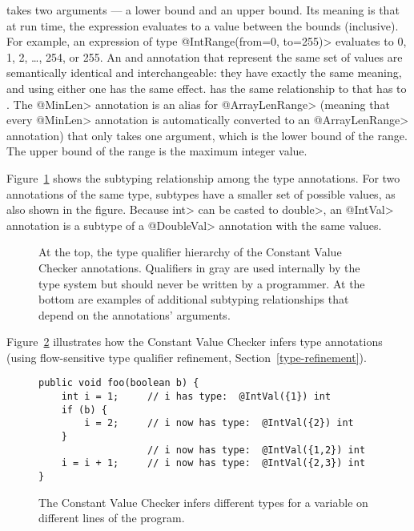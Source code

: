  takes two arguments --- a lower
bound and an upper bound.  Its meaning is that at run time, the expression
evaluates to a value between the bounds (inclusive).  For example, an
expression of type \<@IntRange(from=0, to=255)> evaluates to
0, 1, 2, \ldots, 254, or 255.
An  and
 annotation that represent the
same set of values are semantically identical and interchangeable:  they
have exactly the same meaning, and using either one has the same effect.
 has the same relationship
to  that
 has to
.
The \<@MinLen> annotation is an alias for \<@ArrayLenRange> (meaning that every \<@MinLen> annotation
 is automatically converted to an \<@ArrayLenRange> annotation) that only takes
one argument, which is the lower bound of the range. The upper bound of the
range is the maximum integer value.

Figure~\ref{fig-value-hierarchy} shows the
subtyping relationship among the type annotations.
For two annotations of the same type, subtypes have a smaller set of
possible values, as also shown in the figure.
Because \<int> can be casted to \<double>, an \<@IntVal> annotation is a
subtype of a \<@DoubleVal> annotation with the same values.

\begin{figure}
\caption{At the top, the type qualifier hierarchy of the Constant Value Checker
annotations. Qualifiers in gray are used
internally by the type system but should never be written by a
programmer.  At the bottom are examples of additional subtyping
relationships that depend on the annotations' arguments.}
\label{fig-value-hierarchy}
\end{figure}

Figure~\ref{fig-value-multivalue} illustrates how the Constant Value Checker
infers type annotations (using flow-sensitive type qualifier refinement, Section~\ref{type-refinement}).

\begin{figure}
\begin{Verbatim}
public void foo(boolean b) {
    int i = 1;     // i has type:  @IntVal({1}) int
    if (b) {
        i = 2;     // i now has type:  @IntVal({2}) int
    }
                   // i now has type:  @IntVal({1,2}) int
    i = i + 1;     // i now has type:  @IntVal({2,3}) int
}
\end{Verbatim}
\caption{The Constant Value Checker infers different types
  for a variable on different lines of the program.}
\label{fig-value-multivalue}
\end{figure}

